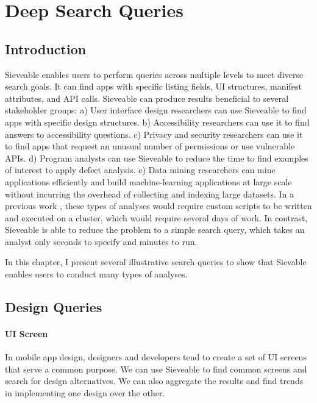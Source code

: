 \chapter{Deep Search Queries}
\label{ch:queries_chapter}

\section{Introduction}
Sieveable enables users to perform queries across multiple levels to meet diverse search goals.
It can find apps with specific listing fields, UI structures, manifest attributes, and API calls.
Sieveable can produce results beneficial to several stakeholder groups:
a) User interface design researchers can use Sieveable to find apps with specific design structures.
b) Accessibility researchers can use it to find answers to accessibility questions.
c) Privacy and security researchers can use it to find apps that request an unusual number of permissions or use vulnerable APIs.
d) Program analysts can use Sieveable to reduce the time to find examples of interest to apply defect analysis.
e) Data mining researchers can mine applications efficiently and build machine-learning applications at large scale without incurring the overhead of collecting and indexing large datasets.
In a previous work \cite{Alharbi_2015_MobileHCI}, these types of analyses would require custom scripts to be written and executed on a cluster, which would require several days of work.
In contrast, Sieveable is able to reduce the problem to a simple search query, which takes an analyst only seconds to specify and minutes to run.

In this chapter, I present several illustrative search queries to show that Sievable enables users to conduct many types of analyses.

\section{Design Queries}
\subsubsection{UI Screen}
In mobile app design, designers and developers tend to create a set of UI screens that serve a common purpose. 
We can use Sieveable to find common screens and search for design alternatives.
We can also aggregate the results and find trends in implementing one design over the other.

